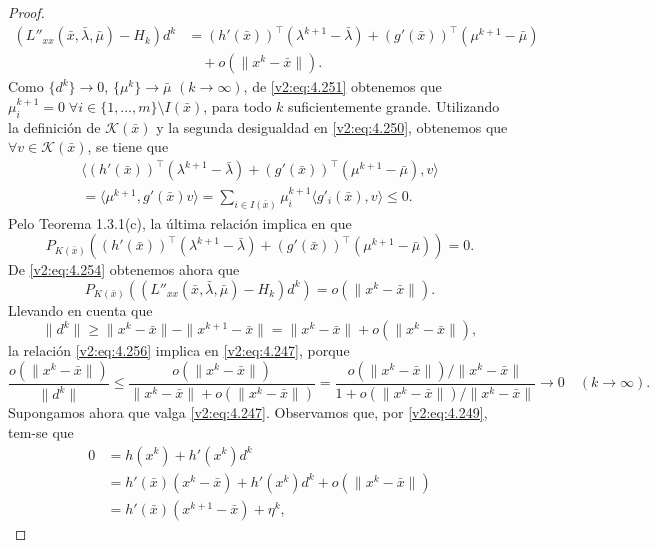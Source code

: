 \begin{proof}
    \begin{align}
        (L''_{xx}(\bar{x}, \bar{\lambda}, \bar{\mu}) - H_k)d^k &= (h'(\bar{x}))^\top(\lambda^{k+1} - \bar{\lambda}) + (g'(\bar{x}))^\top(\mu^{k+1} - \bar{\mu}) \nonumber \\
        &\quad + o(\|x^k - \bar{x}\|).
        \label{v2:eq:4.254}
    \end{align}
    Como $\{d^k\} \to 0$, $\{\mu^k\} \to \bar{\mu}$ $(k \to \infty)$, de \eqref{v2:eq:4.251} obtenemos que $\mu_i^{k+1} = 0 \; \forall i \in \{1, \dots, m\} \setminus I(\bar{x})$, para todo $k$ suficientemente grande. Utilizando la definición de $\mathcal{K}(\bar{x})$ y la segunda desigualdad en \eqref{v2:eq:4.250}, obtenemos que $\forall v \in \mathcal{K}(\bar{x})$, se tiene que
    \begin{align}
        \langle (h'(\bar{x}))^\top(\lambda^{k+1} - \bar{\lambda}) + (g'(\bar{x}))^\top(\mu^{k+1} - \bar{\mu}), v \rangle \nonumber \\
        = \langle \mu^{k+1}, g'(\bar{x})v \rangle = \sum_{i \in I(\bar{x})} \mu_i^{k+1}\langle g'_i(\bar{x}), v \rangle \le 0.
        \label{v2:eq:4.255}
    \end{align}
    Pelo Teorema 1.3.1(c), la última relación implica en que
    \[
        P_{K(\bar{x})} ((h'(\bar{x}))^\top(\lambda^{k+1} - \bar{\lambda}) + (g'(\bar{x}))^\top(\mu^{k+1} - \bar{\mu})) = 0.
    \]
    De \eqref{v2:eq:4.254} obtenemos ahora que
    \begin{equation}
        P_{K(\bar{x})} ((L''_{xx}(\bar{x}, \bar{\lambda}, \bar{\mu}) - H_k)d^k) = o(\|x^k - \bar{x}\|).
        \label{v2:eq:4.256}
    \end{equation}
    Llevando en cuenta que
    \[
        \|d^k\| \ge \|x^k - \bar{x}\| - \|x^{k+1} - \bar{x}\| = \|x^k - \bar{x}\| + o(\|x^k - \bar{x}\|),
    \]
    la relación \eqref{v2:eq:4.256} implica en \eqref{v2:eq:4.247}, porque
    \[
        \frac{o(\|x^k - \bar{x}\|)}{\|d^k\|} \le \frac{o(\|x^k - \bar{x}\|)}{\|x^k - \bar{x}\| + o(\|x^k - \bar{x}\|)} = \frac{o(\|x^k - \bar{x}\|)/\|x^k - \bar{x}\|}{1 + o(\|x^k - \bar{x}\|)/\|x^k - \bar{x}\|} \to 0 \quad (k \to \infty).
    \]
    Supongamos ahora que valga \eqref{v2:eq:4.247}. Observamos que, por \eqref{v2:eq:4.249}, tem-se que
    \begin{align}
        0 &= h(x^k) + h'(x^k)d^k \nonumber \\
        &= h'(\bar{x})(x^k - \bar{x}) + h'(x^k)d^k + o(\|x^k - \bar{x}\|) \nonumber \\
        &= h'(\bar{x})(x^{k+1} - \bar{x}) + \eta^k,

\end{align}
\end{proof}
